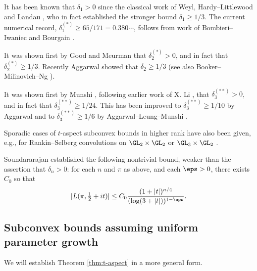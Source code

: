 It has been known that $\delta_1 > 0$ since the classical work of Weyl, Hardy--Littlewood and Landau \cite{MR1511862, MR1544665}, who in fact established the stronger bound $\delta_1 \geq 1/3$.  The current numerical record, $\delta_1^{(*)} \geq 65/171 = 0.380\dotsb$, follows from work of Bombieri--Iwaniec \cite{MR881101} and Bourgain \cite{MR3556291}.

It was shown first by Good \cite{MR696884} and Meurman \cite{MR1058223} that $\delta_2^{(*)} > 0$, and in fact that $\delta_2^{(*)} \geq 1/3$.  Recently Aggarwal \cite{MR4032289} showed that $\delta_2 \geq 1/3$ (see also Booker--Milinovich--Ng \cite{MR3872849}).



It was shown first by Munshi \cite{MR3369905}, following earlier work of X. Li \cite{MR2753605}, that $\delta_3^{(**)} > 0$, and in fact that $\delta_3^{(**)} \geq 1/24$.  This has been improved to $\delta_3^{(**)} \geq 1/10$ by Aggarwal \cite{MR4270876} and to $\delta_3^{(**)} \geq 1/6$ by Aggarwal--Leung--Munshi \cite{2022arXiv220606517A}.


Sporadic cases of $t$-aspect subconvex bounds in higher rank have also been given, e.g., for Rankin--Selberg convolutions on $\GL_2 \times \GL_2$ \cite{MR2726097, 2021arXiv210112106B} or $\GL_3 \times \GL_2$ \cite{2018arXiv181000539M}.

Soundararajan \cite[Example 3]{MR2680497} established the following nontrivial bound, weaker than the assertion that $\delta_n > 0$: for each $n$ and $\pi$ as above, and each $\eps > 0$, there exists $C_0$ so that
\begin{equation}\label{eq:lpi-tfrac12-+-1}
  |L(\pi, \tfrac{1}{2} + i t)| \leq C_0 \frac{(1 + |t|)^{n/4} }{(\log (3 + |t|))^{1 - \eps }}.
\end{equation}



\subsection{Subconvex bounds assuming uniform parameter growth}\label{sec:subc-bounds-assum}

We will establish Theorem \ref{thm:t-aspect} in a more general form.

